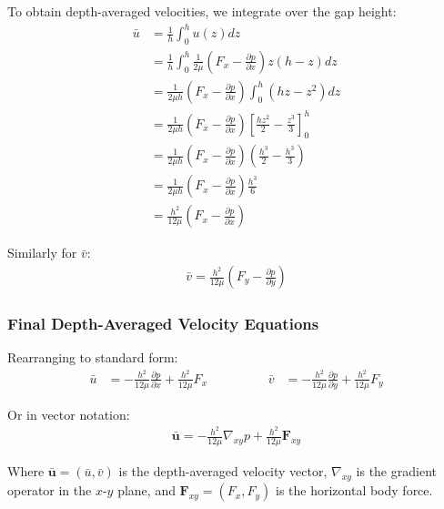 \documentclass[12pt,a4paper]{article}
\begin{document}
To obtain depth-averaged velocities, we integrate over the gap height:
\begin{align}
    \bar{u} &= \frac{1}{h}\int_0^h u(z) dz \\
    &= \frac{1}{h}\int_0^h \frac{1}{2\mu}\left(F_x - \frac{\partial p}{\partial x}\right)z(h-z) dz \\
    &= \frac{1}{2\mu h}\left(F_x - \frac{\partial p}{\partial x}\right)\int_0^h (hz - z^2) dz \\
    &= \frac{1}{2\mu h}\left(F_x - \frac{\partial p}{\partial x}\right)\left[\frac{hz^2}{2} - \frac{z^3}{3}\right]_0^h \\
    &= \frac{1}{2\mu h}\left(F_x - \frac{\partial p}{\partial x}\right)\left(\frac{h^3}{2} - \frac{h^3}{3}\right) \\
    &= \frac{1}{2\mu h}\left(F_x - \frac{\partial p}{\partial x}\right)\frac{h^3}{6} \\
    &= \frac{h^2}{12\mu}\left(F_x - \frac{\partial p}{\partial x}\right)
\end{align}

Similarly for $\bar{v}$:
\begin{align}
    \bar{v} = \frac{h^2}{12\mu}\left(F_y - \frac{\partial p}{\partial y}\right)
\end{align}

\subsubsection*{Final Depth-Averaged Velocity Equations}

Rearranging to standard form:
\begin{equation}
   \begin{aligned}
    \bar{u} &= -\frac{h^2}{12\mu}\frac{\partial p}{\partial x} + \frac{h^2}{12\mu}F_x 
    \hspace{2cm}
    \bar{v} &= -\frac{h^2}{12\mu}\frac{\partial p}{\partial y} + \frac{h^2}{12\mu}F_y
\end{aligned}
\end{equation}

Or in vector notation:
\begin{align}
    \bar{\mathbf{u}} = -\frac{h^2}{12\mu}\nabla_{xy} p + \frac{h^2}{12\mu}\mathbf{F}_{xy}
\end{align}

Where $\bar{\mathbf{u}} = (\bar{u}, \bar{v})$ is the depth-averaged velocity vector, $\nabla_{xy}$ is the gradient operator in the $x$-$y$ plane, and $\mathbf{F}_{xy} = (F_x, F_y)$ is the horizontal body force.
\end{document}

